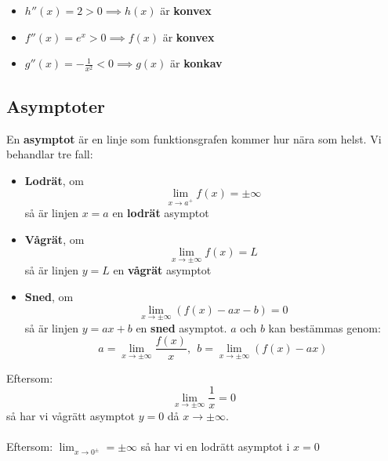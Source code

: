 \documentclass{report}
\begin{document}
{
	\begin{itemize}
		\item $ h''(x) = 2 > 0 \implies h(x) $ är \textbf{konvex}
		\item $ f''(x) = e^x > 0 \implies f(x) $ är \textbf{konvex}
		\item $ g''(x) = - \frac{1}{x^2} < 0 \implies g(x) $ är \textbf{konkav} 
	\end{itemize}
}

\subsection{Asymptoter}
{
En \textbf{asymptot} är en linje som funktionsgrafen kommer hur nära som helst. Vi behandlar tre fall:
\begin{itemize}
	\item \textbf{Lodrät}, om
	\begin{equation*}
	\lim_{x \to a^+} f(x) = \pm \infty
	\end{equation*}
	så är linjen $ x = a $ en \textbf{lodrät} asymptot
	\item \textbf{Vågrät}, om
	\begin{equation*}
	\lim_{x \to  \pm \infty} f(x) = L
	\end{equation*}
	så är linjen $ y = L $ en \textbf{vågrät} asymptot
	\item \textbf{Sned}, om
	\begin{equation*}
	\lim_{x \to  \pm \infty} (f(x)-ax-b) = 0
	\end{equation*}
	så är linjen $ y = ax+b $ en \textbf{sned} asymptot. $ a $ och $ b $ kan bestämmas genom:
	\begin{equation*}
	a = \lim_{x \to \pm \infty} \frac{f(x)}{x},\:\: b = \lim_{x \to \pm \infty} (f(x)-ax)
	\end{equation*}
	
\end{itemize}
}


\pagebreak
{}
{
Eftersom:
\begin{equation*}
\lim_{x \to \pm \infty} \frac{1}{x} = 0
\end{equation*}
så har vi vågrätt asymptot $ y = 0 $ då $ x \to \pm \infty $.\\\\

Eftersom:
$ \lim_{x \to 0^{\pm}} = \pm \infty $ så har vi en lodrätt asymptot i $ x = 0 $ 
}
\end{document}
